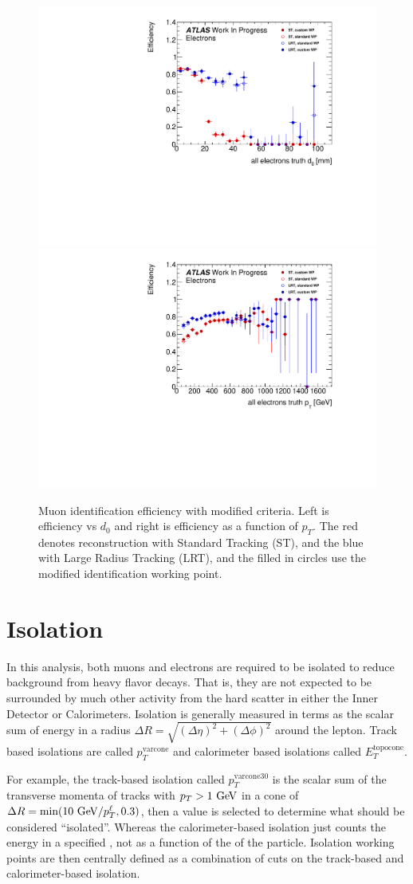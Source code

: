 \begin{figure}[htbp]
\centering
\includegraphics[width=.48\textwidth]{figures/EventReconstruction/wp_e_d0_all_wip.pdf}
\includegraphics[width=.48\textwidth]{figures/EventReconstruction/wp_e_pt_all_wip.pdf}
\caption{Muon identification efficiency with modified criteria. Left is efficiency vs $d_{0}$ and right is efficiency as a function of $p_{T}$. The red denotes reconstruction with Standard Tracking (ST), and the blue with Large Radius Tracking (LRT), and the filled in circles use the modified identification working point. }
\label{fig:cust_elec_eff}
\end{figure}




\section{Isolation}
\label{sec:isolation}

In this analysis, both muons and electrons are required to be isolated to reduce background from heavy flavor decays. That is, they are not expected to be surrounded by much other activity from the hard scatter in either the Inner Detector or Calorimeters. Isolation is generally measured in terms as the scalar sum of energy in a radius $\Delta R = \sqrt{(\Delta \eta)^2 + (\Delta \phi)^2}$ around the lepton. Track based isolations are called $p_{T}^{\textrm{varcone}}$ and calorimeter based isolations called $E_{T}^{\textrm{topocone}}$. 

For example, the track-based isolation called $p_{T}^{\textrm{varcone30}}$ is the scalar sum of the transverse momenta of tracks with $p_{T} > 1 \GeV$ in a cone of $\Delta R = \textrm{min}(10 \GeV/p_{T}^{\ell}, 0.3)$, then a value is selected to determine what should be considered ``isolated''. Whereas the calorimeter-based isolation just counts the energy in a specified \dR, not as a function of the \pt of the particle. Isolation working points are then centrally defined as a combination of cuts on the track-based and calorimeter-based isolation. 

